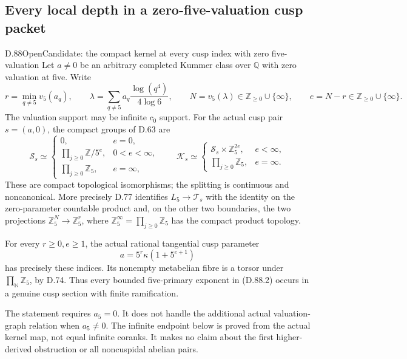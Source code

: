 \subsection{Every local depth in a zero-five-valuation cusp packet}

\begin{statement}{D.88}{Open}{Candidate: the compact kernel at every cusp index with zero five-valuation}
Let \(a\ne0\) be an arbitrary completed Kummer class over
\(\mathbb Q\) with zero valuation at five. Write
\[
 r=\min_{q\ne5}v_5(a_q),\qquad
 \lambda=\sum_{q\ne5}a_q\frac{\log(q^4)}{4\log6},
 \qquad N=v_5(\lambda)\in\mathbb Z_{\ge0}\cup\{\infty\},
 \qquad e=N-r\in\mathbb Z_{\ge0}\cup\{\infty\}.                                    \tag{D.88.1}
\]
The valuation support may be infinite \(c_0\) support. For the
actual cusp pair \(s=(a,0)\), the compact groups of D.63 are
\[
 \mathcal S_s\simeq
 \begin{cases}
  0,&e=0,\\
  \displaystyle\prod_{j\ge0}\mathbb Z/5^e,&0<e<\infty,\\
  \displaystyle\prod_{j\ge0}\mathbb Z_5,&e=\infty,
 \end{cases}
 \qquad
 \mathcal K_s\simeq
 \begin{cases}
  \mathcal S_s\times\mathbb Z_5^{2e},&e<\infty,\\
  \displaystyle\prod_{j\ge0}\mathbb Z_5,&e=\infty.
 \end{cases}
                                                               \tag{D.88.2}
\]
These are compact topological isomorphisms; the splitting is
continuous and noncanonical. More precisely D.77 identifies
\(L_5\to\mathcal T_s\) with the identity on the zero-parameter
countable product and, on the other two boundaries, the two
projections \(\mathbb Z_5^N\to\mathbb Z_5^r\),
where \(\mathbb Z_5^\infty=\prod_{j\ge0}\mathbb Z_5\)
has the compact product topology.

For every \(r\ge0,e\ge1\), the actual rational tangential
cusp parameter
\[
                    a=5^r\kappa(1+5^{e+1})             \tag{D.88.3}
\]
has precisely these indices. Its nonempty metabelian fibre is
a torsor under \(\prod_{\mathbb N}\mathbb Z_5\), by D.74.
Thus every bounded five-primary exponent in (D.88.2) occurs
in a genuine cusp section with finite ramification.

The statement requires \(a_5=0\).
It does not handle the additional actual valuation-graph
relation when \(a_5\ne0\). The infinite endpoint below
is proved from the actual kernel map, not equal infinite coranks. It makes no claim about the first
higher-derived obstruction or all noncuspidal abelian pairs.
\end{statement}

